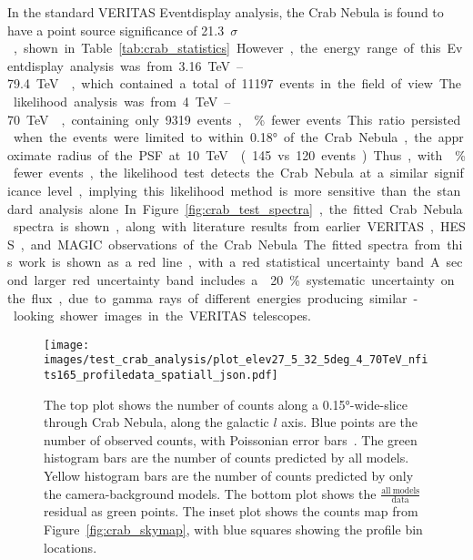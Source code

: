 In the standard VERITAS Eventdisplay analysis, the Crab Nebula is found to have a point source significance of \SI{21.3}{$\sigma$}, shown in Table~\ref{tab:crab_statistics}.
However, the energy range of this Eventdisplay analysis was from \SIrange{3.16}{79.4}{\TeV{}}, which contained a total of 11197 events in the field of view.
The likelihood analysis was from \SIrange{4}{70}{\TeV{}}, containing only 9319 events, \% fewer events.
This ratio persisted when the events were limited to within \ang{0.18} of the Crab Nebula, the approximate radius of the PSF at \SI{10}{\TeV{}} (145 vs 120 events).
Thus, with \% fewer events, the likelihood test detects the Crab Nebula at a similar significance level, implying this likelihood method is more sensitive than the standard analysis alone.
In Figure~\ref{fig:crab_test_spectra}, the fitted Crab Nebula spectra is shown, along with literature results from earlier VERITAS, HESS, and MAGIC observations of the Crab Nebula.
The fitted spectra from this work is shown as a red line, with a red statistical uncertainty band.
A second larger red uncertainty band includes a \nicetilde{}20\% systematic uncertainty on the flux, due to gamma rays of different energies producing similar-looking shower images in the VERITAS telescopes.

\begin{figure}[p]
  \centering
  \texttt{[image: images/test\_crab\_analysis/plot\_elev27\_5\_32\_5deg\_4\_70TeV\_nfits165\_profiledata\_spatiall\_json.pdf]}
  \caption[Crab Nebula Profile along Galactic $l$]
  {
    The top plot shows the number of counts along a \ang{0.15}-wide-slice through Crab Nebula, along the galactic $l$ axis.
    Blue points are the number of observed counts, with Poissonian error bars~\cite{poissonfrequentistinterval}.
    The green histogram bars are the number of counts predicted by all models.
    Yellow histogram bars are the number of counts predicted by only the camera-background models.
    The bottom plot shows the $\frac{\mathrm{all\:models}}{\mathrm{data}}$ residual as green points.
    The inset plot shows the counts map from Figure~\ref{fig:crab_skymap}, with blue squares showing the profile bin locations.
  }
  \label{fig:crab_profile_l}
\end{figure}

